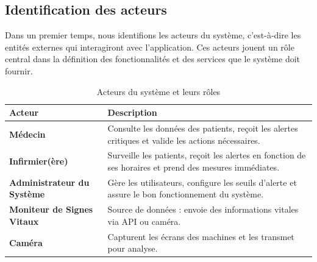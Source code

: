 \subsection{Identification des acteurs}

Dans un premier temps, nous identifions les acteurs du système, c'est-à-dire les entités externes qui interagiront avec l'application. Ces acteurs jouent un rôle central dans la définition des fonctionnalités et des services que le système doit fournir.
\begin{table}[H]
    \centering
    \renewcommand{\arraystretch}{1.3}
    \begin{tabular}{| m{3cm} | m{7cm} |}
        \hline
        \textbf{Acteur} & \textbf{Description} \\
        \hline
        \textbf{Médecin} & Consulte les données des patients, reçoit les alertes critiques et valide les actions nécessaires. \\
        \hline
        \textbf{Infirmier(ère)} & Surveille les patients, reçoit les alertes en fonction de ses horaires et prend des mesures immédiates. \\
        \hline
        \textbf{Administrateur du Système} & Gère les utilisateurs, configure les seuils d'alerte et assure le bon fonctionnement du système. \\
        \hline
        \textbf{Moniteur de Signes Vitaux} & Source de données : envoie des informations vitales via API ou caméra. \\
        \hline
        \textbf{Caméra} & Capturent les écrans des machines et les transmet pour analyse. \\
        \hline
    \end{tabular}
    \caption{Acteurs du système et leurs rôles}
\end{table}